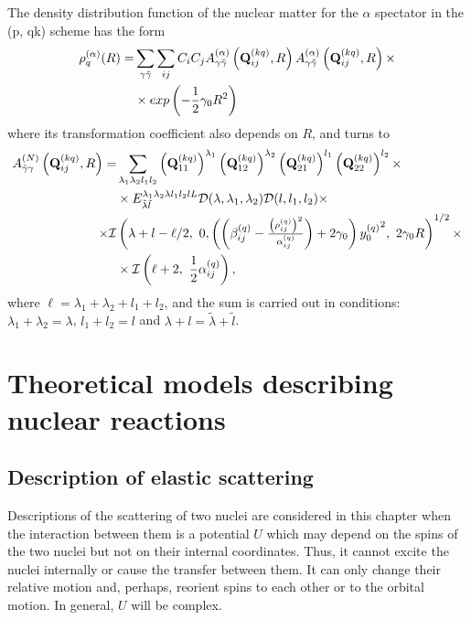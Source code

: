 \documentclass[
12pt, %
oneside, %
english, %
onehalfspacing, %
onehalfspacing, %
headsepline, %
]{MastersDoctoralThesis} %
\begin{document}
The density distribution function of the nuclear matter for the $\alpha$ spectator in the (p, qk) scheme has the form
\begin{align}
\rho_q^{(\alpha)}(R)= &
\sum_{\gamma \tilde{\gamma}}
\sum_{ij}
C_i C_j
A^{(\alpha)}_{\gamma\tilde{\gamma}}\left( {\bf Q}_{ij}^{(kq)}, R \right)
A^{(\alpha)}_{\gamma\tilde{\gamma}}\left( {\bf Q}_{ij}^{(kq)}, R \right) 
\times \nonumber \\
& \times
exp \left( -\frac{1}{2} 
\gamma_0 R^2
\right)
\label{pqk_density_a}
\end{align}
where its transformation coefficient also depends on $R$, and  turns to
\begin{align}
A^{(N)}_{\tilde{\gamma}\gamma}\left( {\bf Q}^{(kq)}_{ij}, R \right) = & \sum_{\lambda_1 \lambda_2 l_1 l_2} 
\left({\bf Q}_{11}^{(kq)} \right)^{\lambda_1} 
\left({\bf Q}_{12}^{(kq)} \right)^{\lambda_2} 
\left({\bf Q}_{21}^{(kq)} \right)^{l_1} 
\left({\bf Q}_{22}^{(kq)} \right)^{l_2} 
\times \nonumber
\\
& \times {E}^{\lambda_1 \lambda_2 \lambda l_1 l_2 l L}_{\tilde{\lambda} \tilde{l} } \mathcal{D}(\lambda,\lambda_1,\lambda_2) \mathcal{D}(l,l_1,l_2)
\times  \nonumber    \\
 \times 
 \mathcal{I} & \left( \lambda + l - \ell/2, 
~0, 
\left( \left(  \beta^{(q)}_{ij} - \tfrac{\left(\rho^{(q)}_{ij}\right)^2}{\alpha^{(q)}_{ij}} \right) +2 \gamma_0 \right) {y_0^{(q)}}^2,~
2\gamma_0 R
 \right)^{1/2} \times \nonumber \\
& \times  \mathcal{I} \left( \ell +2,~ \frac{1}{2} \alpha_{ij}^{(q)} \right)
 ,
\end{align}
where $\ell=\lambda_1+\lambda_2+l_1+l_2$, and the sum is carried out in conditions: $\lambda_1+\lambda_2=\lambda$, $l_1+l_2=l$ and $\lambda+l=\tilde{\lambda}+\tilde{l}$.

\chapter{Theoretical models describing nuclear reactions} %

\label{Chapter2} %


\section{Description of elastic scattering}
Descriptions of the scattering of two nuclei are considered in this chapter when the interaction between them is a potential $U$ which may depend on the spins of the two nuclei but not on their internal coordinates. Thus, it cannot excite the nuclei internally or cause the transfer between them. It can only change their relative motion and, perhaps, reorient spins to each other or to the orbital motion. In general, $U$ will be complex. 
\end{document}
